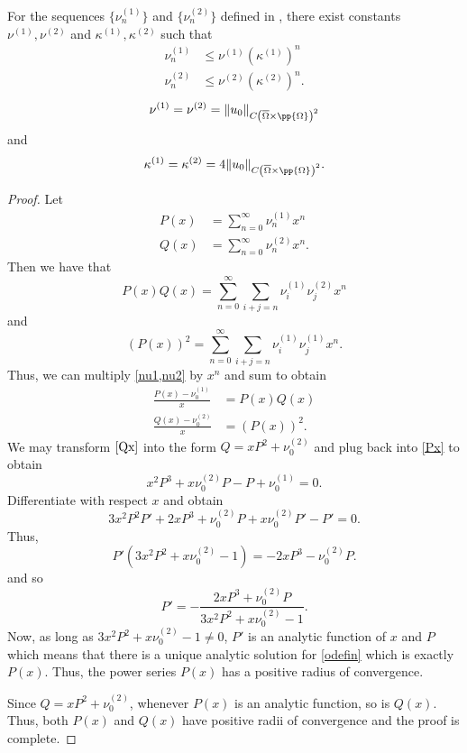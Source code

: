 \documentclass[a4paper, 12pt]{article}
\begin{document}
\begin{lem}
	For the sequences $\{ \nu_{n}^{(1)} \}$ and $\{ \nu_{n}^{(2)} \}$ defined in , there exist constants $\nu^{(1)},\nu^{(2)}$ and $\kappa^{(1)}, \kappa^{(2)}$ such that
	\begin{align}
		\label{convg1}\nu_{n}^{(1)} &\le \nu^{(1)} \left( \kappa^{(1)} \right)^{n}\\
		\label{convg2}\nu_{n}^{(2)} &\le \nu^{(2)} \left( \kappa^{(2)} \right)^{n}
	.\end{align} 
	\[
	\nu^{(1)} = \nu^{(2)} = \lVert u_0 \rVert_{C\left( \overline{\Omega} \times \pp{\Omega} \right)^2}
	\] 
	and 
	\[
		\kappa^{(1)} = \kappa^{(2)} = 4\lVert u_0 \rVert_{C\left( \overline{\Omega} \times \pp{\Omega} \right)^2}
	.\] 
\end{lem}
\begin{proof}
	Let
	\begin{align*}
		P\left( x \right) &= \sum_{n=0}^{\infty} \nu_{n}^{(1)}x^{n} \\
		Q\left( x \right) &= \sum_{n=0}^{\infty} \nu_{n}^{(2)}x^{n}
	.\end{align*}
	Then we have that
	\[
	P\left( x \right) Q\left( x \right) = \sum_{n=0}^{\infty} \sum_{i + j = n}^{} \nu_{i}^{(1)}\nu_{j}^{(2)}x^{n}
	\] 
	and 
	\[
		\left( P\left( x \right) \right) ^2
		= \sum_{n=0}^{\infty} \sum_{i + j = n} \nu_{i}^{(1)}\nu_{j}^{(1)}x^{n}
	.\] 
Thus, we can multiply \cref{nu1,nu2} by $x^{n}$ and sum to obtain
\begin{align}
	\label{Px}\frac{P\left( x \right) -\nu_0^{(1)}}{x} &= P\left( x \right) Q\left( x \right)  \\
	\label{Qx}\frac{Q\left( x \right) -\nu_0^{(2)}}{x} &= \left(P\left( x \right)\right)^2
.\end{align}
We may transform $\cref{Qx}$ into the form $Q= x P^2 + \nu_0^{(2)}$ and plug back into \cref{Px} to obtain
\[
x^2P^3+ x\nu_0^{(2)}P- P +\nu_0^{(1)} = 0
.\] 
Differentiate with respect $x$ and obtain
\[
3x^2P^2P' + 2xP^3 + \nu_0^{(2)}P + x\nu_0^{(2)}P' - P' = 0
.\] 
Thus,
\[
P'\left(3x^2P^2+ x\nu_0^{(2)}-1\right) = -2xP^3 - \nu_0^{(2)}P
.\] 
and so
\begin{equation}\label{odefin}
P' = -\frac{2xP^3 + \nu_0^{(2)}P}{3x^2P^2 + x\nu_0^{(2)}- 1}
.\end{equation} 
Now, as long as $3x^2P^2 + x\nu_0^{(2)}- 1 \neq 0$, $P'$ is an analytic function of $x$ and $P$ which means that there is a unique analytic solution for \cref{odefin} which is exactly $P\left( x \right)$. 
Thus, the power series $P\left( x \right) $ has a positive radius of convergence.

Since $Q = xP^2+ \nu_0^{(2)}$, whenever $P\left( x \right) $ is an analytic function, so is $Q\left( x \right)$.
Thus, both $P\left( x \right)$ and $Q\left( x \right)$ have positive radii of convergence and the proof is complete.
\end{proof}
\end{document}
